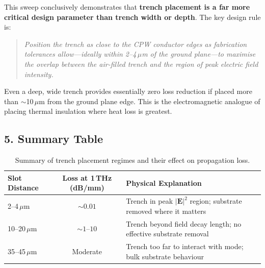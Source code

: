 This sweep conclusively demonstrates that \textbf{trench placement is a far more critical design parameter than trench width or depth}. The key design rule is:

\begin{quote}
\textit{Position the trench as close to the CPW conductor edges as fabrication tolerances allow---ideally within 2--4\,$\mu$m of the ground plane---to maximise the overlap between the air-filled trench and the region of peak electric field intensity.}
\end{quote}

Even a deep, wide trench provides essentially zero loss reduction if placed more than $\sim$10\,$\mu$m from the ground plane edge. This is the electromagnetic analogue of placing thermal insulation where heat loss is greatest.

\subsection*{5. Summary Table}

\begin{table}[h]
\centering
\begin{tabular}{|l|c|l|}
\hline
\textbf{Slot Distance} & \textbf{Loss at 1\,THz (dB/mm)} & \textbf{Physical Explanation} \\
\hline
2--4\,$\mu$m & $\sim 0.01$ & Trench in peak $|\mathbf{E}|^2$ region; substrate removed where it matters \\
\hline
10--20\,$\mu$m & $\sim 1$--$10$ & Trench beyond field decay length; no effective substrate removal \\
\hline
35--45\,$\mu$m & Moderate & Trench too far to interact with mode; bulk substrate behaviour \\
\hline
\end{tabular}
\caption{Summary of trench placement regimes and their effect on propagation loss.}
\end{table}

